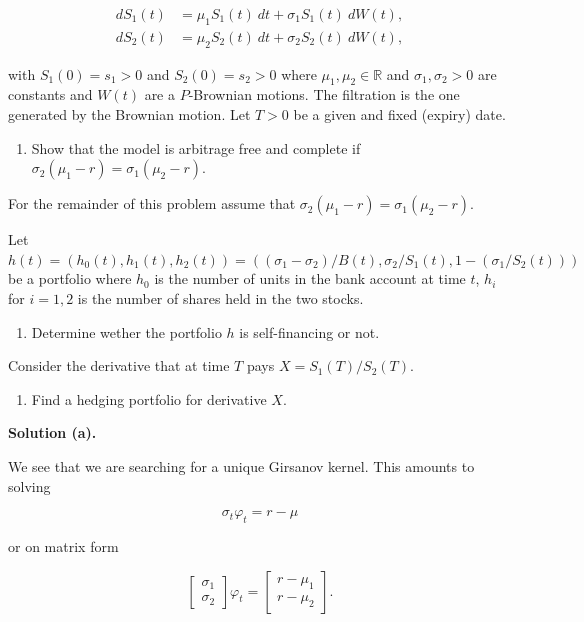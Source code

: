 \documentclass[
]{book}
\providecommand{\tightlist}{%
  \setlength{\itemsep}{0pt}\setlength{\parskip}{0pt}}
\begin{document}
\begin{align*}
dS_1(t)&=\mu_1S_1(t)\ dt+\sigma_1 S_1(t)\ dW(t),\\
dS_2(t)&=\mu_2S_2(t)\ dt+\sigma_2 S_2(t)\ dW(t),
\end{align*}

with \(S_1(0)=s_1>0\) and \(S_2(0)=s_2>0\) where \(\mu_1,\mu_2\in\mathbb{R}\) and \(\sigma_1,\sigma_2>0\) are constants and \(W(t)\) are a \(P\)-Brownian motions. The filtration is the one generated by the Brownian motion. Let \(T>0\) be a given and fixed (expiry) date.

\begin{enumerate}
\def\labelenumi{\alph{enumi}.}
\tightlist
\item
  Show that the model is arbitrage free and complete if \(\sigma_2(\mu_1-r)=\sigma_1(\mu_2-r)\).
\end{enumerate}

For the remainder of this problem assume that \(\sigma_2(\mu_1-r)=\sigma_1(\mu_2-r)\).

Let \(h(t)=(h_0(t),h_1(t),h_2(t))=((\sigma_1-\sigma_2)/B(t),\sigma_2/S_1(t),1-(\sigma_1/S_2(t)))\) be a portfolio where \(h_0\) is the number of units in the bank account at time \(t\), \(h_i\) for \(i=1,2\) is the number of shares held in the two stocks.

\begin{enumerate}
\def\labelenumi{\alph{enumi}.}
\setcounter{enumi}{1}
\tightlist
\item
  Determine wether the portfolio \(h\) is self-financing or not.
\end{enumerate}

Consider the derivative that at time \(T\) pays \(X=S_1(T)/S_2(T)\).

\begin{enumerate}
\def\labelenumi{\alph{enumi}.}
\setcounter{enumi}{2}
\tightlist
\item
  Find a hedging portfolio for derivative \(X\).
\end{enumerate}

\noindent\makebox[\linewidth]{\rule{\textwidth}{0.4pt}}

\textbf{Solution (a).}

We see that we are searching for a unique Girsanov kernel. This amounts to solving

\[
\sigma_t\varphi_t=r-\mu
\]

or on matrix form

\[
\begin{bmatrix}
\sigma_1 \\
\sigma_2
\end{bmatrix}
\varphi_t=
\begin{bmatrix}
r-\mu_1\\
r-\mu_2
\end{bmatrix}.
\]
\end{document}
